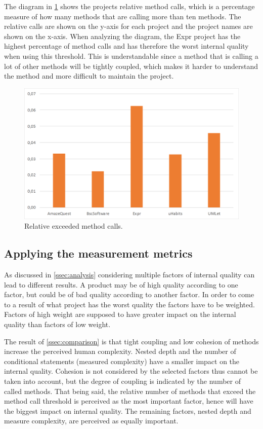 \documentclass[conference]{IEEEtran}
\begin{document}
The diagram in \cref{fig:exceed_calls} shows the projects relative method calls, which is a percentage measure of how many methods that are calling more than ten methods. The relative calls are shown on the y-axis for each project and the project names are shown on the x-axis. When analyzing the diagram, the Expr project has the highest percentage of method calls and has therefore the worst internal quality when using this threshold. This is understandable since a method that is calling a lot of other methods will be tightly coupled, which makes it harder to understand the method and more difficult to maintain the project. 
\begin{figure}
	\includegraphics[width=\columnwidth]{img/rel_exceeded_calls.png}
\caption{Relative exceeded method calls.}
\label{fig:exceed_calls}
\end{figure}

\subsection{Applying the measurement metrics}
\label{ssec:applying}
As discussed in \cref{ssec:analysis} considering multiple factors of internal quality can lead to different results. A product may be of high quality according to one factor, but could be of bad quality according to another factor. In order to come to a result of what project has the worst quality the factors have to be weighted. Factors of high weight are supposed to have greater impact on the internal quality than factors of low weight. 

The result of \cref{ssec:comparison} is that tight coupling and low cohesion of methods increase the perceived human complexity. Nested depth and the number of conditional statements (measured complexity) have a smaller impact on the internal quality. Cohesion is not considered by the selected factors thus cannot be taken into account, but the degree of coupling is indicated by the number of called methods. That being said, the relative number of methods that exceed the method call threshold is perceived as the most important factor, hence will have the biggest impact on internal quality. The remaining factors, nested depth and measure complexity, are perceived as equally important.
\end{document}
